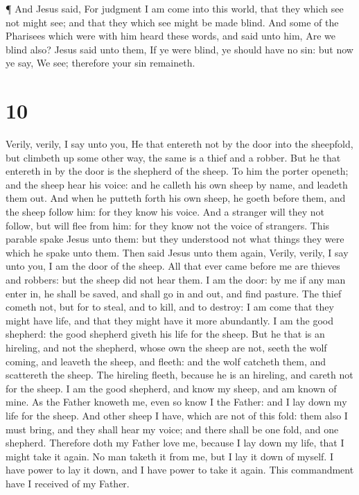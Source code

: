  ¶ And Jesus said, For judgment I am come into this world,
that they which see not might see; and that they which see might be made
blind.  And some of the Pharisees which were with him heard
these words, and said unto him, Are we blind also?  Jesus
said unto them, If ye were blind, ye should have no sin: but now ye say,
We see; therefore your sin remaineth.

\hypertarget{section-9}{%
\section{10}\label{section-9}}

 Verily, verily, I say unto you, He that entereth not by the
door into the sheepfold, but climbeth up some other way, the same is a
thief and a robber.  But he that entereth in by the door is
the shepherd of the sheep.  To him the porter openeth; and
the sheep hear his voice: and he calleth his own sheep by name, and
leadeth them out.  And when he putteth forth his own sheep,
he goeth before them, and the sheep follow him: for they know his voice.
 And a stranger will they not follow, but will flee from
him: for they know not the voice of strangers.  This parable
spake Jesus unto them: but they understood not what things they were
which he spake unto them.  Then said Jesus unto them again,
Verily, verily, I say unto you, I am the door of the sheep. 
All that ever came before me are thieves and robbers: but the sheep did
not hear them.  I am the door: by me if any man enter in, he
shall be saved, and shall go in and out, and find pasture. 
The thief cometh not, but for to steal, and to kill, and to destroy: I
am come that they might have life, and that they might have it more
abundantly.  I am the good shepherd: the good shepherd
giveth his life for the sheep.  But he that is an hireling,
and not the shepherd, whose own the sheep are not, seeth the wolf
coming, and leaveth the sheep, and fleeth: and the wolf catcheth them,
and scattereth the sheep.  The hireling fleeth, because he
is an hireling, and careth not for the sheep.  I am the
good shepherd, and know my sheep, and am known of mine.  As
the Father knoweth me, even so know I the Father: and I lay down my life
for the sheep.  And other sheep I have, which are not of
this fold: them also I must bring, and they shall hear my voice; and
there shall be one fold, and one shepherd.  Therefore doth
my Father love me, because I lay down my life, that I might take it
again.  No man taketh it from me, but I lay it down of
myself. I have power to lay it down, and I have power to take it again.
This commandment have I received of my Father.

